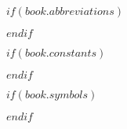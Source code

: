 \listoftables %
% 
$if(book.abbreviations)$



$endif$

$if(book.constants)$



$endif$


$if(book.symbols)$



$endif$


\mainmatter

\pagestyle{thesis} %

\sloppy %


